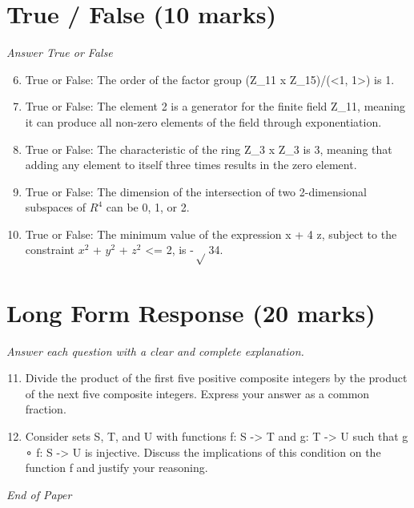 \documentclass[12pt]{article}
\begin{document}
\section*{True / False (10 marks)}
\textit{Answer True or False}
\begin{enumerate}[label=\arabic*.]
\setcounter{enumi}{5}
\item True or False: The order of the factor group (Z\_11 x Z\_15)/(\textless{}1, 1\textgreater{}) is 1.
\item True or False: The element 2 is a generator for the finite field Z\_11, meaning it can produce all non-zero elements of the field through exponentiation.
\item True or False: The characteristic of the ring Z\_3 x Z\_3 is 3, meaning that adding any element to itself three times results in the zero element.
\item True or False: The dimension of the intersection of two 2-dimensional subspaces of $R^4$ can be 0, 1, or 2.
\item True or False: The minimum value of the expression x + 4 z, subject to the constraint $x^2$ + $y^2$ + $z^2$ \textless{}= 2, is -\ensuremath{\sqrt} 34.
\end{enumerate}

\section*{Long Form Response (20 marks)}
\textit{Answer each question with a clear and complete explanation.}
\begin{enumerate}[label=\arabic*.]
\setcounter{enumi}{10}
\item Divide the product of the first five positive composite integers by the product of the next five composite integers. Express your answer as a common fraction.
\item Consider sets S, T, and U with functions f: S -\textgreater{} T and g: T -\textgreater{} U such that g ∘ f: S -\textgreater{} U is injective. Discuss the implications of this condition on the function f and justify your reasoning.
\end{enumerate}

\vfill
\noindent\textit{End of Paper}
\end{document}
